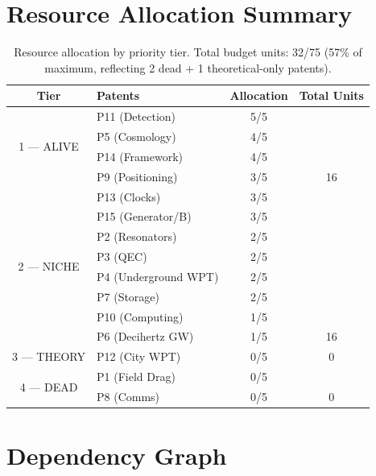 \documentclass[11pt]{article}
\begin{document}
\section{Resource Allocation Summary}
\label{sec:resources}

\begin{table}[H]
\centering
\caption{Resource allocation by priority tier. Total budget units: 32/75
(57\% of maximum, reflecting 2 dead + 1 theoretical-only patents).}
\label{tab:resources}
\begin{tabular}{@{}clcc@{}}
\toprule
\textbf{Tier} & \textbf{Patents} & \textbf{Allocation} &
  \textbf{Total Units} \\
\midrule
\multirow{4}{*}{1 --- ALIVE} & P11 (Detection) & 5/5 & \\
  & P5 (Cosmology) & 4/5 & \\
  & P14 (Framework) & 4/5 & \\
  & P9 (Positioning) & 3/5 & 16 \\
\midrule
\multirow{8}{*}{2 --- NICHE} & P13 (Clocks) & 3/5 & \\
  & P15 (Generator/B) & 3/5 & \\
  & P2 (Resonators) & 2/5 & \\
  & P3 (QEC) & 2/5 & \\
  & P4 (Underground WPT) & 2/5 & \\
  & P7 (Storage) & 2/5 & \\
  & P10 (Computing) & 1/5 & \\
  & P6 (Decihertz GW) & 1/5 & 16 \\
\midrule
3 --- THEORY & P12 (City WPT) & 0/5 & 0 \\
\midrule
\multirow{2}{*}{4 --- DEAD} & P1 (Field Drag) & 0/5 & \\
  & P8 (Comms) & 0/5 & 0 \\
\bottomrule
\end{tabular}
\end{table}

\section{Dependency Graph}
\label{sec:dependency}
\end{document}
